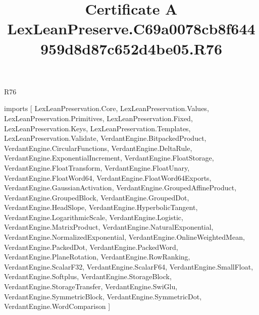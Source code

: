 \begin{lexlean}{R76}
\title{Certificate A LexLeanPreserve.C69a0078cb8f644959d8d87c652d4be05.R76}
\begin{coremodule}
imports [
  LexLeanPreservation.Core,
  LexLeanPreservation.Values,
  LexLeanPreservation.Primitives,
  LexLeanPreservation.Fixed,
  LexLeanPreservation.Keys,
  LexLeanPreservation.Templates,
  LexLeanPreservation.Validate,
  VerdantEngine.BitpackedProduct,
  VerdantEngine.CircularFunctions,
  VerdantEngine.DeltaRule,
  VerdantEngine.ExponentialIncrement,
  VerdantEngine.FloatStorage,
  VerdantEngine.FloatTransform,
  VerdantEngine.FloatUnary,
  VerdantEngine.FloatWord64,
  VerdantEngine.FloatWord64Exports,
  VerdantEngine.GaussianActivation,
  VerdantEngine.GroupedAffineProduct,
  VerdantEngine.GroupedBlock,
  VerdantEngine.GroupedDot,
  VerdantEngine.HeadSlope,
  VerdantEngine.HyperbolicTangent,
  VerdantEngine.LogarithmicScale,
  VerdantEngine.Logistic,
  VerdantEngine.MatrixProduct,
  VerdantEngine.NaturalExponential,
  VerdantEngine.NormalizedExponential,
  VerdantEngine.OnlineWeightedMean,
  VerdantEngine.PackedDot,
  VerdantEngine.PackedWord,
  VerdantEngine.PlaneRotation,
  VerdantEngine.RowRanking,
  VerdantEngine.ScalarF32,
  VerdantEngine.ScalarF64,
  VerdantEngine.SmallFloat,
  VerdantEngine.Softplus,
  VerdantEngine.StorageBlock,
  VerdantEngine.StorageTransfer,
  VerdantEngine.SwiGlu,
  VerdantEngine.SymmetricBlock,
  VerdantEngine.SymmetricDot,
  VerdantEngine.WordComparison
]


\end{coremodule}
\end{lexlean}
